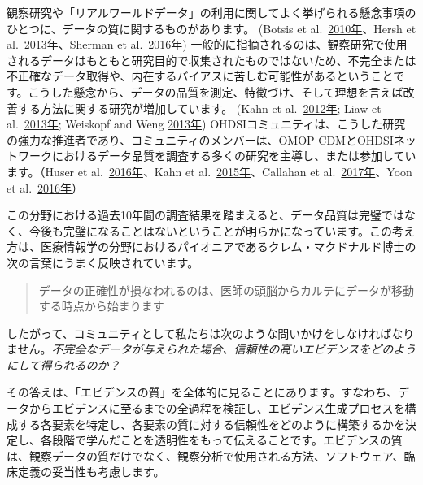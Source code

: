 \documentclass[
  11pt]{book}
\theoremstyle{definition}
\theoremstyle{definition}
\theoremstyle{definition}
\theoremstyle{definition}
\theoremstyle{remark}
\begin{document}
観察研究や「リアルワールドデータ」の利用に関してよく挙げられる懸念事項のひとつに、データの質に関するものがあります。 (Botsis et al.~\href{https://ohdsi.github.io/TheBookOfOhdsi/EvidenceQuality.html\#ref-botsis2010secondary}{2010年}、Hersh et al.~\href{https://ohdsi.github.io/TheBookOfOhdsi/EvidenceQuality.html\#ref-hersh2013caveats}{2013年}、Sherman et al.~\href{https://ohdsi.github.io/TheBookOfOhdsi/EvidenceQuality.html\#ref-sherman2016real}{2016年}) 一般的に指摘されるのは、観察研究で使用されるデータはもともと研究目的で収集されたものではないため、不完全または不正確なデータ取得や、内在するバイアスに苦しむ可能性があるということです。こうした懸念から、データの品質を測定、特徴づけ、そして理想を言えば改善する方法に関する研究が増加しています。 (Kahn et al.~\href{https://ohdsi.github.io/TheBookOfOhdsi/EvidenceQuality.html\#ref-kahn2012pragmatic}{2012年}; Liaw et al.~\href{https://ohdsi.github.io/TheBookOfOhdsi/EvidenceQuality.html\#ref-liaw2013towards}{2013年}; Weiskopf and Weng \href{https://ohdsi.github.io/TheBookOfOhdsi/EvidenceQuality.html\#ref-weiskopf_2013}{2013年}) OHDSIコミュニティは、こうした研究の強力な推進者であり、コミュニティのメンバーは、OMOP CDMとOHDSIネットワークにおけるデータ品質を調査する多くの研究を主導し、または参加しています。（Huser et al.~\href{https://ohdsi.github.io/TheBookOfOhdsi/EvidenceQuality.html\#ref-huser_multisite_2016}{2016年}、Kahn et al.~\href{https://ohdsi.github.io/TheBookOfOhdsi/EvidenceQuality.html\#ref-kahn_transparent_2015}{2015年}、Callahan et al.~\href{https://ohdsi.github.io/TheBookOfOhdsi/EvidenceQuality.html\#ref-callahan2017comparison}{2017年}、Yoon et al.~\href{https://ohdsi.github.io/TheBookOfOhdsi/EvidenceQuality.html\#ref-yoon_2016}{2016年}）

この分野における過去10年間の調査結果を踏まえると、データ品質は完璧ではなく、今後も完璧になることはないということが明らかになっています。この考え方は、医療情報学の分野におけるパイオニアであるクレム・マクドナルド博士の次の言葉にうまく反映されています。

\begin{quote}
データの正確性が損なわれるのは、医師の頭脳からカルテにデータが移動する時点から始まります 
\end{quote}

したがって、コミュニティとして私たちは次のような問いかけをしなければなりません。\emph{不完全なデータが与えられた場合、信頼性の高いエビデンスをどのようにして得られるのか？}

その答えは、「エビデンスの質」を全体的に見ることにあります。すなわち、データからエビデンスに至るまでの全過程を検証し、エビデンス生成プロセスを構成する各要素を特定し、各要素の質に対する信頼性をどのように構築するかを決定し、各段階で学んだことを透明性をもって伝えることです。エビデンスの質は、観察データの質だけでなく、観察分析で使用される方法、ソフトウェア、臨床定義の妥当性も考慮します。 
\end{document}
